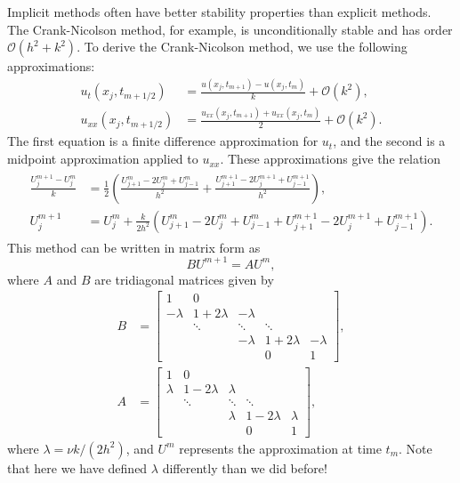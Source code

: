 Implicit methods often have better stability properties than explicit methods.
The Crank-Nicolson method, for example, is unconditionally stable and has order $\mathcal{O}(h^2 + k^2)$.
To derive the Crank-Nicolson method, we use the following approximations:
\begin{align*}
	u_t(x_j,t_{m+1/2}) &= \frac{u(x_j,t_{m+1}) - u(x_j,t_m)}{k} + \mathcal{O}(k^2), \\
	u_{xx}(x_j,t_{m+1/2}) &= \frac{u_{xx}(x_j,t_{m+1}) + u_{xx}(x_j,t_m)}{2} + \mathcal{O}(k^2).
\end{align*}
The first equation is a finite difference approximation for \(u_t\), and the second is a midpoint approximation applied to \(u_{xx}\). 
These approximations give the relation
\begin{align}
	\begin{split}
	\frac{U^{m+1}_j - U^m_j}{k} &= \frac{1}{2}\left( \frac{U^m_{j+1} - 2U^m_{j} + U^m_{j-1}}{h^2} + \frac{U^{m+1}_{j+1} - 2U^{m+1}_{j} + U^{m+1}_{j-1}}{h^2}  \right) ,\\
	U^{m+1}_j  &= U^m_j + \frac{k}{2h^2} \left( U^m_{j+1} - 2U^m_{j} + U^m_{j-1} + U^{m+1}_{j+1} - 2U^{m+1}_{j} + U^{m+1}_{j-1}   \right).
\end{split}
\end{align}
This method can be written in matrix form as
\[BU^{m+1} = A U^m,\]
where $A$ and $B$ are tridiagonal matrices given by
\begin{align*}
B &= \left[\begin{array}{cccccc}1 & 0 &  &  &  \\ -\lambda & 1+2\lambda &  -\lambda & &  \\ &  \ddots &   \ddots & \ddots \\ & &  -\lambda &  1+2\lambda & -\lambda \\ &  &  & 0 & 1\end{array}\right], \\
A &= \left[\begin{array}{cccccc}1 & 0 &  &  &  \\ \lambda & 1-2\lambda &  \lambda & &  \\ &  \ddots &   \ddots & \ddots \\ & &  \lambda &  1-2\lambda & \lambda \\ &  &  & 0 & 1\end{array}\right],
\end{align*}
where $\lambda = \nu k/(2h^2)$, and $U^m$ represents the approximation at time $t_m$.
Note that here we have defined $\lambda$ differently than we did before!

